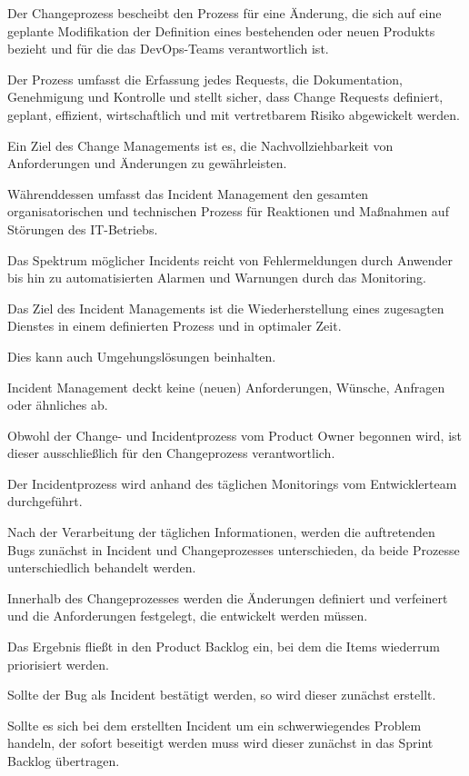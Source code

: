 Der Changeprozess bescheibt den Prozess für eine Änderung, die sich auf eine geplante Modifikation der Definition eines bestehenden oder neuen Produkts bezieht und für die das DevOps-Teams verantwortlich ist. 

Der Prozess umfasst die Erfassung jedes Requests, die Dokumentation, Genehmigung und Kontrolle und stellt sicher, dass Change Requests definiert, geplant, effizient, wirtschaftlich und mit vertretbarem Risiko abgewickelt werden. 

Ein Ziel des Change Managements ist es, die Nachvollziehbarkeit von Anforderungen und Änderungen zu gewährleisten.

Währenddessen umfasst das Incident Management den gesamten organisatorischen und technischen Prozess für Reaktionen und Maßnahmen auf Störungen des IT-Betriebs.

Das Spektrum möglicher Incidents reicht von Fehlermeldungen durch Anwender bis hin zu automatisierten Alarmen und Warnungen durch das Monitoring.

Das Ziel des Incident Managements ist die Wiederherstellung eines zugesagten Dienstes in einem definierten Prozess und in optimaler Zeit. 

Dies kann auch Umgehungslösungen beinhalten. 

Incident Management deckt keine (neuen) Anforderungen, Wünsche, Anfragen oder ähnliches ab.  

Obwohl der Change- und Incidentprozess vom Product Owner begonnen wird, ist dieser ausschließlich für den Changeprozess verantwortlich. 

Der Incidentprozess wird anhand des täglichen Monitorings vom Entwicklerteam durchgeführt. 

Nach der Verarbeitung der täglichen Informationen, werden die auftretenden Bugs zunächst in Incident und Changeprozesses unterschieden, da beide Prozesse unterschiedlich behandelt werden.

Innerhalb des Changeprozesses werden die Änderungen definiert und verfeinert und die Anforderungen festgelegt, die entwickelt werden müssen. 

Das Ergebnis fließt in den Product Backlog ein, bei dem die Items wiederrum priorisiert werden. 

Sollte der Bug als Incident bestätigt werden, so wird dieser zunächst erstellt. 

Sollte es sich bei dem erstellten Incident um ein schwerwiegendes Problem handeln, der sofort beseitigt werden muss wird dieser zunächst in das Sprint Backlog übertragen.

